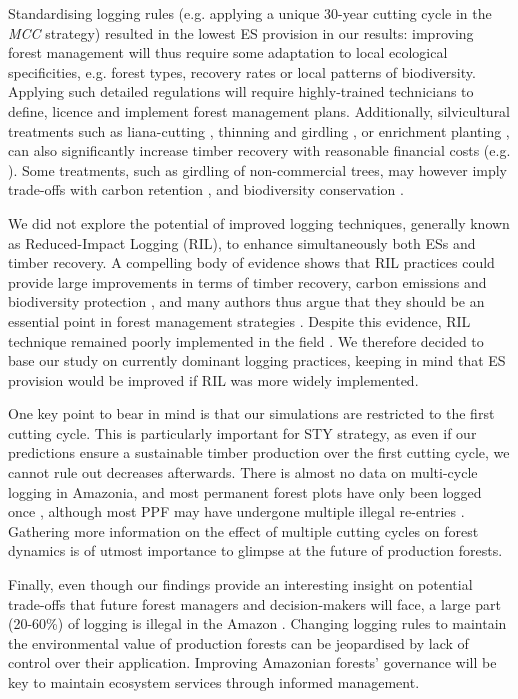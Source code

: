 \documentclass[12pt]{article}
\begin{document}
Standardising logging rules (e.g. applying a unique 30-year cutting cycle in the \textit{MCC} strategy) resulted in the lowest ES provision in our results: improving forest management will thus require some adaptation to local ecological specificities, e.g. forest types, recovery rates or local patterns of biodiversity. Applying such detailed regulations will require highly-trained technicians to define, licence and implement forest management plans. Additionally, silvicultural treatments such as liana-cutting \cite{Mills2019}, thinning and girdling \cite{Pena-Claros2008}, or enrichment planting \cite{Schwartz2013,Navarro-Cerrillo2011}, can also significantly increase timber recovery with reasonable financial costs (e.g. \cite{Mills2019}). Some treatments, such as  girdling of non-commercial trees, may however imply trade-offs with carbon retention \cite{Roopsind2018}, and biodiversity conservation \cite{Ruslandi2017}. 

We did not explore the potential of improved logging techniques, generally known as Reduced-Impact Logging (RIL), to enhance simultaneously both ESs and timber recovery. A compelling body of evidence shows that RIL practices could provide large improvements in terms of timber recovery, carbon emissions and biodiversity protection \cite{Griscom2019,Putz2008c,Tobler2018,West2014}, and many authors thus argue that they should be an essential point in forest management strategies \cite{Griscom2018,Runting2018}. Despite this evidence, RIL technique remained poorly implemented in the field \cite{Ellis2019}. We therefore decided to base our study on currently dominant logging practices, keeping in mind that ES provision would be improved if RIL was more widely implemented.

One key point to bear in mind is that our simulations are restricted to the first cutting cycle. This is particularly important for STY strategy, as even if our predictions ensure a sustainable timber production over the first cutting cycle, we cannot rule out decreases afterwards. There is almost no data on multi-cycle logging in Amazonia, and most permanent forest plots have only been logged once \cite{Sist2015}, although most PPF may have undergone multiple illegal re-entries \cite{Tritsch2016a}. Gathering more information on the effect of multiple cutting cycles on forest dynamics is of utmost importance to glimpse at the future of production forests.

Finally, even though our findings provide an interesting insight on potential trade-offs that future forest managers and decision-makers will face, a large part (20-60\%) of logging is illegal in the Amazon \cite{Brancalion2018,Finer2014}. Changing logging rules to maintain the environmental value of production forests can be jeopardised by lack of control over their application. Improving Amazonian forests' governance will be key to maintain ecosystem services through informed management. 
\end{document}
